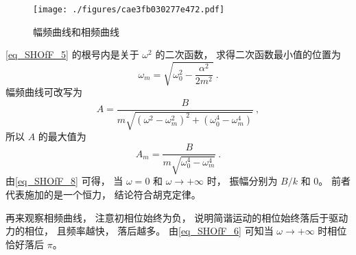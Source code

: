 \begin{figure}[ht]
\centering
\texttt{[image: ./figures/cae3fb030277e472.pdf]}
\caption{幅频曲线和相频曲线} \label{fig_SHOfF_1}
\end{figure}

\autoref{eq_SHOfF_5} 的根号内是关于 $\omega^2$ 的二次函数， 求得二次函数最小值的位置为
\begin{equation}
\omega_m = \sqrt{\omega_0^2 - \frac{\alpha^2}{2m^2}}~.
\end{equation}
幅频曲线可改写为
\begin{equation}\label{eq_SHOfF_8}
A = \frac{B}{m\sqrt{(\omega^2 - \omega_m^2)^2 + (\omega_0^4 - \omega_m^4)}}~,
\end{equation}
所以 $A$ 的最大值为
\begin{equation}
A_m = \frac{B}{m\sqrt{\omega_0^4 - \omega_m^4}}~.
\end{equation}
由\autoref{eq_SHOfF_8} 可得， 当 $\omega = 0$ 和 $\omega\to +\infty$ 时， 振幅分别为 $B/k$ 和 $0$。 前者代表施加的是一个恒力， 结论符合胡克定律。

再来观察相频曲线， 注意初相位始终为负， 说明简谐运动的相位始终落后于驱动力的相位， 且频率越快， 落后越多。 由\autoref{eq_SHOfF_6} 可知当 $\omega\to +\infty$ 时相位恰好落后 $\pi$。



